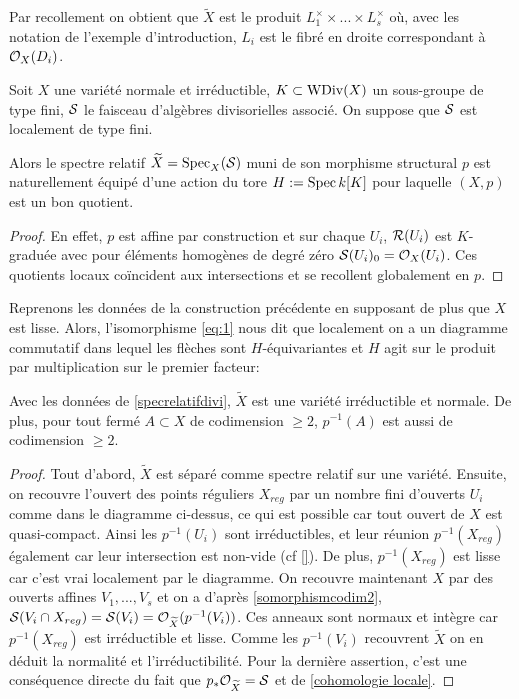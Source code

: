 Par recollement on obtient que $\widetilde{X}$ est le produit $L_1^\times\times...\times L_s^\times$ où, avec les notation de l'exemple d'introduction, $L_i$ est le fibré en droite correspondant à $\mathcal{O}_X(D_i)$. 

\begin{cons}\label{specrelatifdivi}
Soit $X$ une variété normale et irréductible, $K\subset \operatorname{WDiv}(X)$ un sous-groupe de type fini, $\mathcal{S}$ le faisceau d'algèbres divisorielles associé. On suppose que $\mathcal{S}$ est localement de type fini.

Alors le spectre relatif $\widetilde{X}=\operatorname{Spec}_X(\mathcal{S})$ muni de son morphisme structural $p$ est naturellement équipé d'une action du tore $H:=\operatorname{Spec} k[K]$ pour laquelle $(X,p)$ est un bon quotient.
\end{cons}
\begin{proof}
En effet, $p$ est affine par construction et sur chaque $U_i$, $\mathcal{R}(U_i)$ est $K$-graduée avec pour éléments homogènes de degré zéro $\mathcal{S}(U_i)_0=\mathcal{O}_X(U_i)$. Ces quotients locaux coïncident aux intersections et se recollent globalement en $p$.
\end{proof}

Reprenons les données de la construction précédente en supposant de plus que $X$ est lisse. Alors, l'isomorphisme \ref{eq:1} nous dit que localement on a un diagramme commutatif dans lequel les flèches sont $H$-équivariantes et $H$ agit sur le produit par multiplication sur le premier facteur:
\begin{center}
\end{center}

\begin{prop}\label{preimagecodim2}
Avec les données de \ref{specrelatifdivi}, $\widetilde{X}$ est une variété irréductible et normale. De plus, pour tout fermé $A\subset X$ de codimension $\geq 2$, $p^{-1}(A)$ est aussi de codimension $\geq 2$.
\end{prop}
\begin{proof}
Tout d'abord, $\widetilde{X}$ est séparé comme spectre relatif sur une variété. Ensuite, on recouvre l'ouvert des points réguliers $X_{reg}$ par un nombre fini d'ouverts $U_i$ comme dans le diagramme ci-dessus, ce qui est possible car tout ouvert de $X$ est quasi-compact. Ainsi les $p^{-1}(U_i)$ sont irréductibles, et leur réunion $p^{-1}(X_{reg})$ également car leur intersection est non-vide (cf \ref{}). De plus, $p^{-1}(X_{reg})$ est lisse car c'est vrai localement par le diagramme. On recouvre maintenant $X$ par des ouverts affines $V_1,...,V_s$ et on a d'après \ref{somorphismcodim2}, $\mathcal{S}(V_i\cap X_{reg})=\mathcal{S}(V_i)=\mathcal{O}_{\widetilde{X}}(p^{-1}(V_i))$. Ces anneaux sont normaux et intègre car $p^{-1}(X_{reg})$ est irréductible et lisse. Comme les $p^{-1}(V_i)$ recouvrent $\widetilde{X}$ on en déduit la normalité et l'irréductibilité.
Pour la dernière assertion, c'est une conséquence directe du fait que $p_*\mathcal{O}_{\widetilde{X}}=\mathcal{S}$ et de \ref{cohomologie locale}.
\end{proof}

